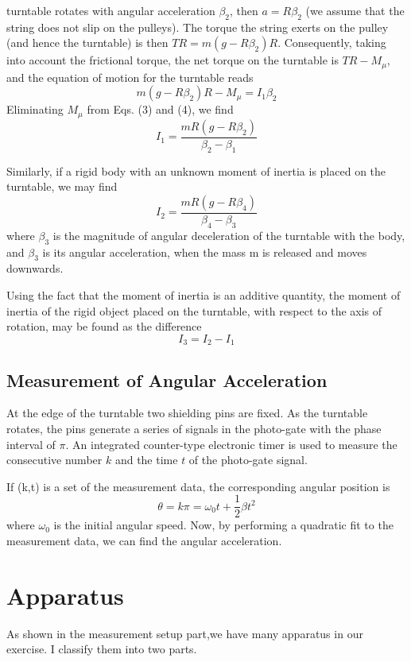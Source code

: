 \documentclass[12pt]{article}
\begin{document}
turntable rotates with angular acceleration $\beta_2$, then $a = R\beta_2$ (we assume that the string does not slip on the pulleys). The torque the string exerts on the pulley (and hence the turntable) is then $TR = m(g-R\beta_2)R$. Consequently, taking into account the frictional torque, the net torque on the turntable is $TR-M_\mu$, and the equation of motion for the turntable reads
\begin{equation}
m(g-R\beta_2)R-M_\mu=I_1\beta_2
\end{equation}
Eliminating $M_\mu$ from Eqs. (3) and (4), we find
\begin{equation}
I_1=\frac{mR(g-R\beta_2)}{\beta_2-\beta_1}
\end{equation}
\par Similarly, if a rigid body with an unknown moment of inertia is placed on the turntable,
we may find
\begin{equation}
I_2=\frac{mR(g-R\beta_4)}{\beta_4-\beta_3}
\end{equation}
where $\beta_3$ is the magnitude of angular deceleration of the turntable with the body, and $\beta_3$ is its angular acceleration, when the mass m is released and moves downwards.
\par Using the fact that the moment of inertia is an additive quantity, the moment of inertia
of the rigid object placed on the turntable, with respect to the axis of rotation, may be
found as the difference
\begin{equation}
I_3=I_2-I_1
\end{equation}
\subsection{Measurement of Angular Acceleration}
At the edge of the turntable two shielding pins are fixed. As the turntable rotates,
the pins generate a series of signals in the photo-gate with the phase interval of $\pi$. An
integrated counter-type electronic timer is used to measure the consecutive number $k$ and
the time $t$ of the photo-gate signal.
\par If (k,t) is a set of the measurement data, the corresponding angular position is
\begin{equation}
\theta=k\pi=\omega_0t+\frac{1}{2}\beta t^2
\end{equation}
where $\omega_0$ is the initial angular speed. Now, by performing a quadratic fit to the measurement data, we can find the angular acceleration.
\section{Apparatus}
As shown in the measurement setup part,we have many apparatus in our exercise. I classify them into two parts. 
\end{document}
